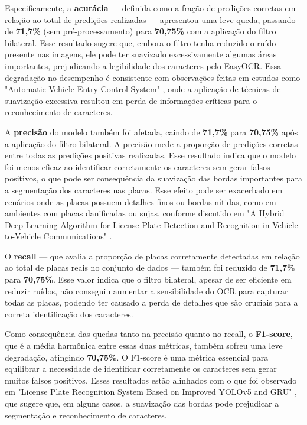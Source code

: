 \documentclass[conference]{IEEEtran}
\begin{document}
Especificamente, a \textbf{acurácia} — definida como a fração de predições corretas em relação ao total de predições realizadas — apresentou uma leve queda, passando de \textbf{71,7\%} (sem pré-processamento) para \textbf{70,75\%} com a aplicação do filtro bilateral. Esse resultado sugere que, embora o filtro tenha reduzido o ruído presente nas imagens, ele pode ter suavizado excessivamente algumas áreas importantes, prejudicando a legibilidade dos caracteres pelo EasyOCR. Essa degradação no desempenho é consistente com observações feitas em estudos como "Automatic Vehicle Entry Control System" \cite{b9}, onde a aplicação de técnicas de suavização excessiva resultou em perda de informações críticas para o reconhecimento de caracteres.

A \textbf{precisão} do modelo também foi afetada, caindo de \textbf{71,7\%} para \textbf{70,75\%} após a aplicação do filtro bilateral. A precisão mede a proporção de predições corretas entre todas as predições positivas realizadas. Esse resultado indica que o modelo foi menos eficaz ao identificar corretamente os caracteres sem gerar falsos positivos, o que pode ser consequência da suavização das bordas importantes para a segmentação dos caracteres nas placas. Esse efeito pode ser exacerbado em cenários onde as placas possuem detalhes finos ou bordas nítidas, como em ambientes com placas danificadas ou sujas, conforme discutido em "A Hybrid Deep Learning Algorithm for License Plate Detection and Recognition in Vehicle-to-Vehicle Communications" \cite{b7}.

O \textbf{recall} — que avalia a proporção de placas corretamente detectadas em relação ao total de placas reais no conjunto de dados — também foi reduzido de \textbf{71,7\%} para \textbf{70,75\%}. Esse valor indica que o filtro bilateral, apesar de ser eficiente em reduzir ruídos, não conseguiu aumentar a sensibilidade do OCR para capturar todas as placas, podendo ter causado a perda de detalhes que são cruciais para a correta identificação dos caracteres.

Como consequência das quedas tanto na precisão quanto no recall, o \textbf{F1-score}, que é a média harmônica entre essas duas métricas, também sofreu uma leve degradação, atingindo \textbf{70,75\%}. O F1-score é uma métrica essencial para equilibrar a necessidade de identificar corretamente os caracteres sem gerar muitos falsos positivos. Esses resultados estão alinhados com o que foi observado em "License Plate Recognition System Based on Improved YOLOv5 and GRU" \cite{b8}, que sugere que, em alguns casos, a suavização das bordas pode prejudicar a segmentação e reconhecimento de caracteres.
\end{document}
